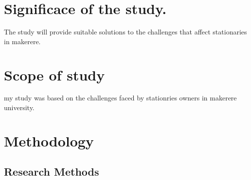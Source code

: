 \documentclass[a4paper,10pt]{article}
\begin{document}
\section{Significace of the study.}
The study will provide suitable solutions to the challenges that affect stationaries in makerere.
\section{Scope of study}
my study was based on the challenges faced by stationries owners in makerere university.

\section{Methodology}
\subsection{Research Methods}

\begin{thebibliography}{1}

\end{thebibliography}
\end{document}
